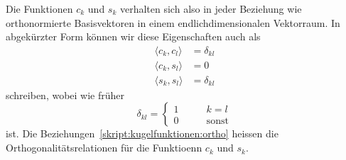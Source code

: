 Die Funktionen $c_k$ und $s_k$ verhalten sich also in jeder Beziehung
wie orthonormierte Basisvektoren in einem endlichdimensionalen Vektorraum.
In abgekürzter Form können wir diese Eigenschaften auch als
\begin{equation}
\begin{aligned}
\langle c_k,c_l\rangle
&=
\delta_{kl}
\\
\langle c_k,s_l\rangle
&=0
\\
\langle s_k,s_l\rangle
&=
\delta_{kl}
\end{aligned}
\label{skript:kugelfunktionen:ortho}
\end{equation}
schreiben, wobei wie früher
\[
\delta_{kl}=\begin{cases}
1&\qquad k=l\\
0&\qquad\text{sonst}
\end{cases}
\]
ist.
Die Beziehungen~\eqref{skript:kugelfunktionen:ortho} heissen die
Orthogonalitätsrelationen für die Funktioenn $c_k$ und $s_k$.
%

